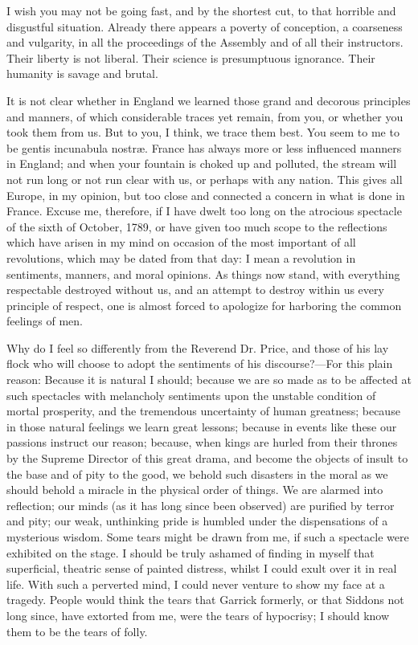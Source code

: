 I wish you may not be going fast, and by the shortest cut, to that horrible and disgustful situation. Already there appears a poverty of conception, a coarseness and vulgarity, in all the proceedings of the Assembly and of all their instructors. Their liberty is not liberal. Their science is presumptuous ignorance. Their humanity is savage and brutal.

It is not clear whether in England we learned those grand and decorous principles and manners, of which considerable traces yet remain, from you, or whether you took them from us. But to you, I think, we trace them best. You seem to me to be gentis incunabula nostræ. France has always more or less influenced manners in England; and when your fountain is choked up and polluted, the stream will not run long or not run clear with us, or perhaps with any nation. This gives all Europe, in my opinion, but too close and connected a concern in what is done in France. Excuse me, therefore, if I have dwelt too long on the atrocious spectacle of the sixth of October, 1789, or have given too much scope to the reflections which have arisen in my mind on occasion of the most important of all revolutions, which may be dated from that day: I mean a revolution in sentiments, manners, and moral opinions. As things now stand, with everything respectable destroyed without us, and an attempt to destroy within us every principle of respect, one is almost forced to apologize for harboring the common feelings of men.

Why do I feel so differently from the Reverend Dr. Price, and those of his lay flock who will choose to adopt the sentiments of his discourse?—For this plain reason: Because it is natural I should; because we are so made as to be affected at such spectacles with melancholy sentiments upon the unstable condition of mortal prosperity, and the tremendous uncertainty of human greatness; because in those natural feelings we learn great lessons; because in events like these our passions instruct our reason; because, when kings are hurled from their thrones by the Supreme Director of this great drama, and become the objects of insult to the base and of pity to the good, we behold such disasters in the moral as we should behold a miracle in the physical order of things. We are alarmed into reflection; our minds (as it has long since been observed) are purified by terror and pity; our weak, unthinking pride is humbled under the dispensations of a mysterious wisdom. Some tears might be drawn from me, if such a spectacle were exhibited on the stage. I should be truly ashamed of finding in myself that superficial, theatric sense of painted distress, whilst I could exult over it in real life. With such a perverted mind, I could never venture to show my face at a tragedy. People would think the tears that Garrick formerly, or that Siddons not long since, have extorted from me, were the tears of hypocrisy; I should know them to be the tears of folly.


